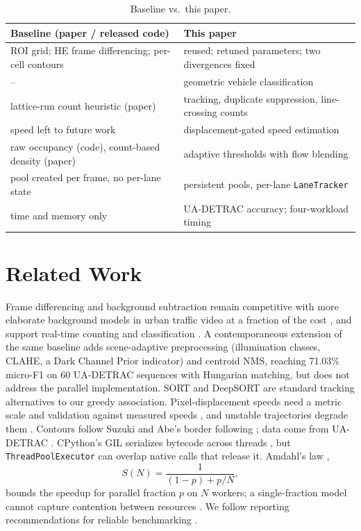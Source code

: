 \documentclass[conference]{IEEEtran}
\newcommand{\code}[1]{\texttt{#1}}
\begin{document}
\begin{table}[t]
\centering
\caption{Baseline \cite{baseline} vs.\ this paper.}
\label{tab:baseline}
\scriptsize
\setlength{\tabcolsep}{3pt}
\begin{tabular}{p{3.85cm}p{4.2cm}}
\toprule
\textbf{Baseline (paper / released code)} & \textbf{This paper} \\
\midrule
ROI grid; HE frame differencing; per-cell contours & reused; retuned parameters; two divergences fixed \\
-- & geometric vehicle classification \\
lattice-run count heuristic (paper) & tracking, duplicate suppression, line-crossing counts \\
speed left to future work & displacement-gated speed estimation \\
raw occupancy (code), count-based density (paper) & adaptive thresholds with flow blending \\
pool created per frame, no per-lane state & persistent pools, per-lane \code{LaneTracker} \\
time and memory only & UA-DETRAC accuracy; four-workload timing \\
\bottomrule
\end{tabular}
\end{table}

\section{Related Work}
\label{sec:related}
Frame differencing and background subtraction remain competitive with
more elaborate background models in urban traffic video at a fraction of
the cost \cite{cheung2004}, and support real-time counting and
classification \cite{unzueta2012,crouzil2016}. A contemporaneous
extension of the same baseline \cite{muthuraja2026} adds scene-adaptive
preprocessing (illumination classes, CLAHE, a Dark Channel Prior
indicator) and centroid NMS, reaching 71.03\% micro-F1 on 60 UA-DETRAC
sequences with Hungarian matching, but does not address the parallel
implementation. SORT \cite{bewley2016} and DeepSORT \cite{wojke2017}
are standard tracking alternatives to our greedy association.
Pixel-displacement speeds need a metric scale and validation against
measured speeds \cite{kamil2024}, and unstable trajectories degrade them
\cite{sangsuwan2024}. Contours follow Suzuki and Abe's border following
\cite{suzuki1985}; data come from UA-DETRAC \cite{wen2020}. CPython's GIL
serializes bytecode across threads \cite{pythongil}, but
\code{ThreadPoolExecutor} \cite{pythonfutures} can overlap native calls
that release it. Amdahl's law \cite{amdahl1967,alhayanni2020},
\begin{equation}
S(N)=\frac{1}{(1-p)+p/N},
\label{eq:amdahl}
\end{equation}
bounds the speedup for parallel fraction $p$ on $N$ workers; a
single-fraction model cannot capture contention between resources
\cite{poolla2023}. We follow reporting recommendations for reliable
benchmarking \cite{beyer2019,kalibera2013}.
\end{document}
